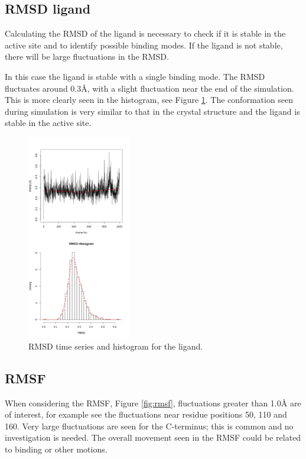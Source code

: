 \documentclass[twocolumn]{bmcart}%
\begin{document}
\subsection*{RMSD ligand}
Calculating the RMSD of the ligand is necessary to check if it is stable in the active site and to identify possible binding modes. If the ligand is not stable, there will be large fluctuations in the RMSD.

In this case the ligand is stable with a single binding mode. The RMSD fluctuates around 0.3{\AA}, with a slight fluctuation near the end of the simulation. This is more clearly seen in the histogram, see Figure \ref{fig:rmsdligand}. The conformation seen during simulation is very similar to that in the crystal structure and the ligand is stable in the active site.

\begin{figure}[ht!]
  \includegraphics[width=0.4\textwidth]{htmd_analysis_rmsd2_merge}
  \caption{
      RMSD time series and histogram for the ligand.}
  \label{fig:rmsdligand}
\end{figure}


\subsection*{RMSF}
When considering the RMSF, Figure \ref{fig:rmsf}, fluctuations greater than 1.0{\AA} are of interest, for example see the fluctuations near residue positions 50, 110 and 160. Very large fluctuations are seen for the C-terminus; this is common and no investigation is needed. The overall movement seen in the RMSF could be related to binding or other motions.
\end{document}
